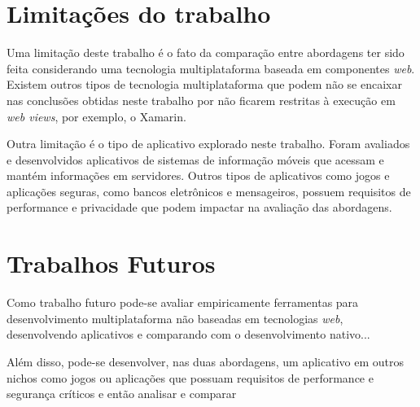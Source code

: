 \section{Limitações do trabalho} \label{section:limitacoestrabalho}
Uma limitação deste trabalho é o fato da comparação entre abordagens ter sido feita considerando uma tecnologia multiplataforma baseada em componentes \textit{web}. Existem outros tipos de tecnologia multiplataforma 
que podem não se encaixar nas conclusões obtidas neste trabalho por não ficarem restritas à execução em \textit{web views}, por exemplo, o Xamarin. 

Outra limitação é o tipo de aplicativo explorado neste trabalho. Foram avaliados e desenvolvidos aplicativos de sistemas de informação móveis que acessam e mantém informações em servidores. 
Outros tipos de aplicativos como jogos e aplicações seguras, como bancos eletrônicos e mensageiros, possuem requisitos de performance e privacidade que podem impactar na avaliação das abordagens.

\section{Trabalhos Futuros} \label{section:trabalhosfuturos}
Como trabalho futuro pode-se avaliar empiricamente ferramentas para desenvolvimento multiplataforma não baseadas em tecnologias \textit{web}, desenvolvendo aplicativos e comparando com o desenvolvimento nativo...

Além disso, pode-se desenvolver, nas duas abordagens, um aplicativo em outros nichos como jogos ou aplicações que possuam requisitos de performance e segurança críticos e então analisar e comparar
